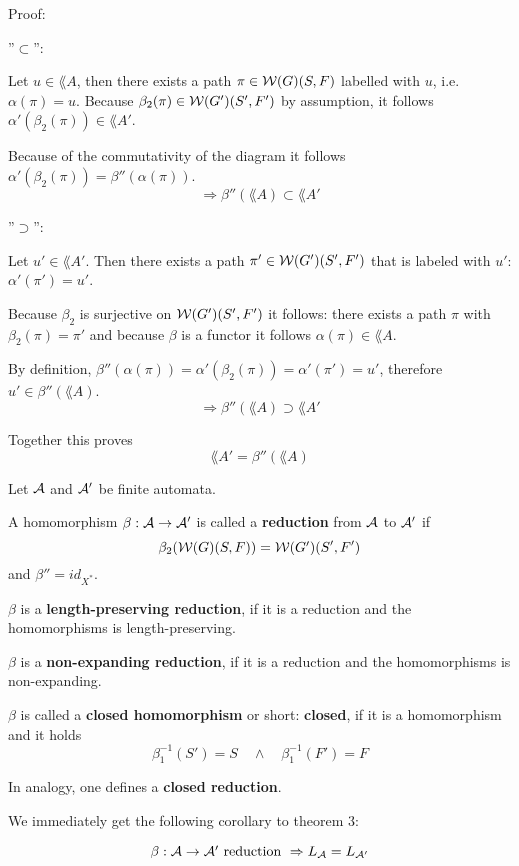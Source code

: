 Proof: 

''$\subset$'':

Let $u \in \lang{A}$, then there exists a path $\pi \in \mbox{$\mathcal{W}(G)$}(S, F)$
labelled with $u$, i.e. $\alpha(\pi) = u$. Because $\beta_2(\pi) \in
\mbox{$\mathcal{W}(G')$}(S',F')$ by assumption, it follows $\alpha'(\beta_2(\pi)) \in
\lang{A'}$.

Because of the commutativity of the diagram it follows $ \alpha'(\beta_2(\pi))
= \beta''(\alpha(\pi))$.
\[ \Rightarrow \beta''(\lang{A}) \subset \lang{A'} \]

''$\supset$'':

Let $u' \in \lang{A'}$. Then there exists a path $\pi' \in \mbox{$\mathcal{W}(G')$}(S', F')$
that is labeled with $u'$: $\alpha'(\pi') = u'$.

Because $\beta_2$ is surjective on $\mbox{$\mathcal{W}(G')$}(S', F')$ it follows: there
exists a path $\pi$ with $\beta_2(\pi) = \pi'$ and because $\beta$ is a functor
it follows $\alpha(\pi) \in \lang{A}$.

By definition, $\beta''(\alpha(\pi)) = \alpha'(\beta_2(\pi)) = \alpha'(\pi') =
u'$, therefore $u' \in \beta''(\lang{A})$.
\[ \Rightarrow  \beta''(\lang{A}) \supset \lang{A'} \]

Together this proves \[ \lang{A'} = \beta''(\lang{A}) \]

\begin{definition}
Let $\mbox{$\mathcal{A}$}$ and $\mbox{$\mathcal{A'}$}$ be finite automata.

A homomorphism $\beta : \mbox{$\mathcal{A \to \mbox{$\mathcal{A'}$}}$}$ is called a {\bf reduction} from
$\mbox{$\mathcal{A}$}$ to $\mbox{$\mathcal{A'}$}$ if \[ \beta_2(\mbox{$\mathcal{W}(G)$}(S, F)) = \mbox{$\mathcal{W}(G')$}(S', F') \]
and $\beta'' = id_{X^*}$.

$\beta$ is a {\bf length-preserving reduction}, if it is a reduction and the
homomorphisms is length-preserving.

$\beta$ is a {\bf non-expanding reduction}, if it is a
reduction and the homomorphisms is non-expanding.

$\beta$	 is called a {\bf closed homomorphism} or short: {\bf closed}, if it is
a homomorphism and it holds \[ \beta_1^{-1}(S') = S \quad\wedge\quad
\beta_1^{-1}(F') = F
\]

In analogy, one defines a {\bf closed reduction}.
\end{definition}

We immediately get the following corollary to theorem 3:

\begin{corollary}
\[ \beta : \mbox{$\mathcal{A}$} \to \mbox{$\mathcal{A'}$} \mbox{ reduction } \Rightarrow \mbox{$L_{\mathcal{A}}$} =
\mbox{$L_{\mathcal{A'}}$} \]
\end{corollary}

